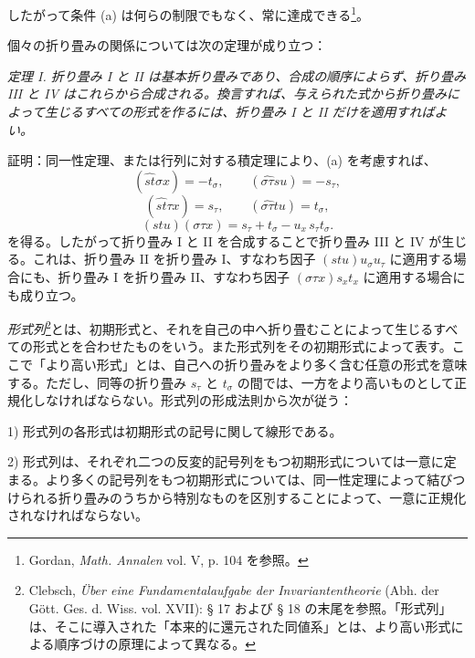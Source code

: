 \documentclass[11pt]{article}
\begin{document}
したがって条件 (a) は何らの制限でもなく、常に達成できる\footnote{Gordan, \emph{Math. Annalen} vol. V, p. 104 を参照。}。

個々の折り畳みの関係については次の定理が成り立つ：

\emph{定理 I. 折り畳み I と II は基本折り畳みであり、合成の順序によらず、折り畳み III と IV はこれらから合成される。換言すれば、与えられた式から折り畳みによって生じるすべての形式を作るには、折り畳み I と II だけを適用すればよい。}

証明：同一性定理、または行列に対する積定理により、(a) を考慮すれば、
\[
(\widehat{st}\sigma x)=-t_\sigma,\qquad
(\widehat{\sigma\tau}su)=-s_\tau,
\]
\[
(\widehat{st}\tau x)=s_\tau,\qquad
(\widehat{\sigma\tau}tu)=t_\sigma,
\]
\[
(stu)(\sigma\tau x)=s_\tau+t_\sigma-u_x\,s_\tau t_\sigma .
\]
を得る。したがって折り畳み I と II を合成することで折り畳み III と IV が生じる。これは、折り畳み II を折り畳み I、すなわち因子 $(stu)u_\sigma u_\tau$ に適用する場合にも、折り畳み I を折り畳み II、すなわち因子 $(\sigma\tau x)s_xt_x$ に適用する場合にも成り立つ。

\emph{形式列}\footnote{Clebsch, \emph{Über eine Fundamentalaufgabe der Invariantentheorie} (Abh. der Gött. Ges. d. Wiss. vol. XVII): § 17 および § 18 の末尾を参照。「形式列」は、そこに導入された「本来的に還元された同値系」とは、より高い形式による順序づけの原理によって異なる。}とは、初期形式と、それを自己の中へ折り畳むことによって生じるすべての形式とを合わせたものをいう。また形式列をその初期形式によって表す。ここで「より高い形式」とは、自己への折り畳みをより多く含む任意の形式を意味する。ただし、同等の折り畳み $s_\tau$ と $t_\sigma$ の間では、一方をより高いものとして正規化しなければならない。形式列の形成法則から次が従う：

1) 形式列の各形式は初期形式の記号に関して線形である。

2) 形式列は、それぞれ二つの反変的記号列をもつ初期形式については一意に定まる。より多くの記号列をもつ初期形式については、同一性定理によって結びつけられる折り畳みのうちから特別なものを区別することによって、一意に正規化されなければならない。
\end{document}
